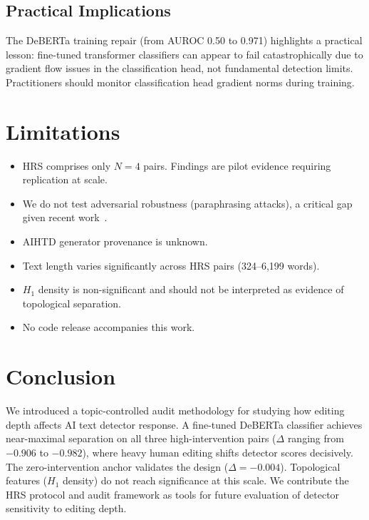\documentclass[conference]{IEEEtran}
\begin{document}
\subsection{Practical Implications}

The DeBERTa training repair (from AUROC 0.50 to 0.971) highlights a practical lesson: fine-tuned transformer classifiers can appear to fail catastrophically due to gradient flow issues in the classification head, not fundamental detection limits. Practitioners should monitor classification head gradient norms during training.

\section{Limitations}

\begin{itemize}
    \item HRS comprises only $N = 4$ pairs. Findings are pilot evidence requiring replication at scale.
    \item We do not test adversarial robustness (paraphrasing attacks), a critical gap given recent work~\cite{krishna2024paraphrasing,sadasivan2023reliable}.
    \item AIHTD generator provenance is unknown.
    \item Text length varies significantly across HRS pairs (324--6,199 words).
    \item $H_1$ density is non-significant and should not be interpreted as evidence of topological separation.
    \item No code release accompanies this work.
\end{itemize}

\section{Conclusion}

We introduced a topic-controlled audit methodology for studying how editing depth affects AI text detector response. A fine-tuned DeBERTa classifier achieves near-maximal separation on all three high-intervention pairs ($\Delta$ ranging from $-0.906$ to $-0.982$), where heavy human editing shifts detector scores decisively. The zero-intervention anchor validates the design ($\Delta = -0.004$). Topological features ($H_1$ density) do not reach significance at this scale. We contribute the HRS protocol and audit framework as tools for future evaluation of detector sensitivity to editing depth.
\end{document}
